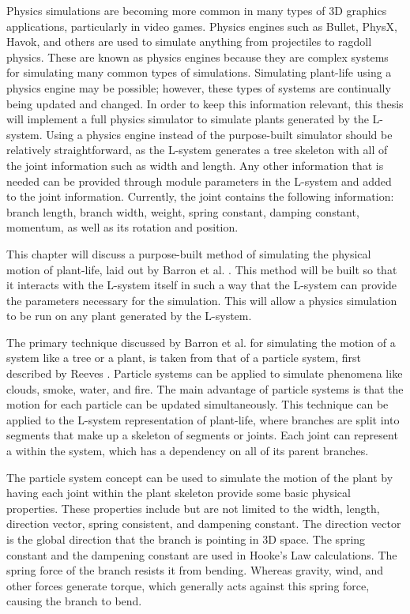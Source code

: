 \lettrine[lines=3]{P}{}hysics simulations are becoming more common in many types of 3D graphics applications, particularly in video games. Physics engines such as Bullet, PhysX, Havok, and others are used to simulate anything from projectiles to ragdoll physics. These are known as physics engines because they are complex systems for simulating many common types of simulations. Simulating plant-life using a physics engine may be possible; however, these types of systems are continually being updated and changed. In order to keep this information relevant, this thesis will implement a full physics simulator to simulate plants generated by the L-system. Using a physics engine instead of the purpose-built simulator should be relatively straightforward, as the L-system generates a tree skeleton with all of the joint information such as width and length. Any other information that is needed can be provided through module parameters in the L-system and added to the joint information. Currently, the joint contains the following information: branch length, branch width, weight, spring constant, damping constant, momentum, as well as its rotation and position. 

This chapter will discuss a purpose-built method of simulating the physical motion of plant-life, laid out by Barron et al. \cite{barron2001real}. This method will be built so that it interacts with the L-system itself in such a way that the L-system can provide the parameters necessary for the simulation. This will allow a physics simulation to be run on any plant generated by the L-system.  

The primary technique discussed by Barron et al. for simulating the motion of a system like a tree or a plant, is taken from that of a particle system, first described by Reeves \cite{reeves1983particle}. Particle systems can be applied to simulate phenomena like clouds, smoke, water, and fire. The main advantage of particle systems is that the motion for each particle can be updated simultaneously. This technique can be applied to the L-system representation of plant-life, where branches are split into segments that make up a skeleton of segments or joints. Each joint can represent a  within the system, which has a dependency on all of its parent branches.

The particle system concept can be used to simulate the motion of the plant by having each joint within the plant skeleton provide some basic physical properties. These properties include but are not limited to the width, length, direction vector, spring consistent, and dampening constant. The direction vector is the global direction that the branch is pointing in 3D space. The spring constant and the dampening constant are used in Hooke's Law calculations. The spring force of the branch resists it from bending. Whereas gravity, wind, and other forces generate torque, which generally acts against this spring force, causing the branch to bend.

